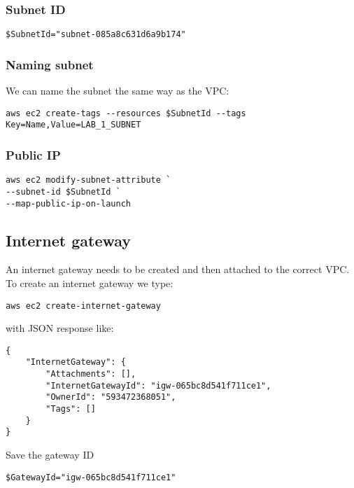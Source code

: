 \documentclass{pgnotes}
\begin{document}
\subsubsection{Subnet ID}

\begin{verbatim}
$SubnetId="subnet-085a8c631d6a9b174"
\end{verbatim}

\subsubsection{Naming subnet}

We can name the subnet the same way as the VPC:

\begin{verbatim}
aws ec2 create-tags --resources $SubnetId --tags Key=Name,Value=LAB_1_SUBNET
\end{verbatim}

\subsubsection{Public IP}

\begin{verbatim}
aws ec2 modify-subnet-attribute `
--subnet-id $SubnetId `
--map-public-ip-on-launch
\end{verbatim}

\subsection{Internet gateway}\label{internet-gateway}

An internet gateway needs to be created and then attached to the correct
VPC. To create an internet gateway we type:

\begin{verbatim}
aws ec2 create-internet-gateway
\end{verbatim}

with JSON response like:

\begin{verbatim}
{
    "InternetGateway": {
        "Attachments": [],
        "InternetGatewayId": "igw-065bc8d541f711ce1",
        "OwnerId": "593472368051",
        "Tags": []
    }
}
\end{verbatim}

Save the gateway ID
\begin{verbatim}
$GatewayId="igw-065bc8d541f711ce1"
\end{verbatim}
\end{document}

